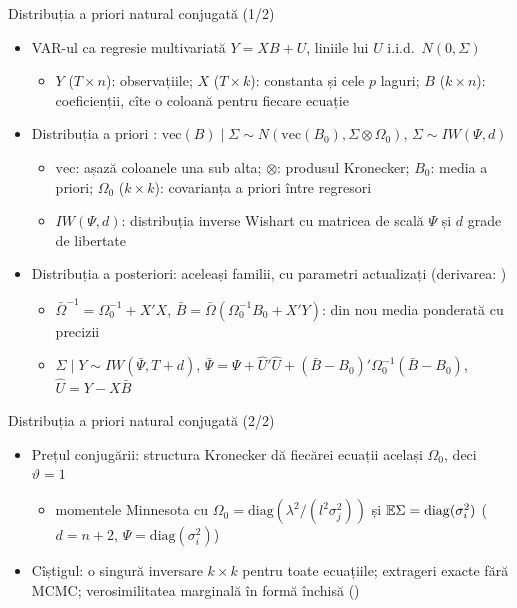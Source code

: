 \begin{frame}{Distribuția a priori natural conjugată (1/2)}
\itemsize{\small}
\begin{itemize}
    \item VAR-ul ca regresie multivariată $Y = XB + U$, liniile lui $U$ i.i.d.\ $N(0, \Sigma)$
    \begin{itemize}
        \item $Y$ ($T\times n$): observațiile; $X$ ($T\times k$): constanta și cele $p$ laguri; $B$ ($k\times n$): coeficienții, cîte o coloană pentru fiecare ecuație
    \end{itemize}
    \item Distribuția a priori : $\mathrm{vec}(B)\mid\Sigma \sim N(\mathrm{vec}(B_0), \Sigma\otimes\Omega_0)$, $\Sigma \sim IW(\Psi, d)$
    \begin{itemize}
        \item $\mathrm{vec}$: așază coloanele una sub alta; $\otimes$: produsul Kronecker; $B_0$: media a priori; $\Omega_0$ ($k\times k$): covarianța a priori între regresori
        \item $IW(\Psi, d)$: distribuția inverse Wishart cu matricea de scală $\Psi$ și $d$ grade de libertate
    \end{itemize}
    \item Distribuția a posteriori: aceleași familii, cu parametri actualizați (derivarea: )  %
    \begin{itemize}
        \item $\bar\Omega^{-1} = \Omega_0^{-1} + X'X$, $\bar B = \bar\Omega(\Omega_0^{-1}B_0 + X'Y)$: din nou media ponderată cu precizii
        \item $\Sigma\mid Y \sim IW(\bar\Psi, T + d)$, $\bar\Psi = \Psi + \hat U'\hat U + (\bar B - B_0)'\Omega_0^{-1}(\bar B - B_0)$, $\hat U = Y - X\bar B$
    \end{itemize}
\end{itemize}
\end{frame}

\begin{frame}{Distribuția a priori natural conjugată (2/2)}
\itemsize{\small}
\begin{itemize}
    \item Prețul conjugării: structura Kronecker dă fiecărei ecuații același $\Omega_0$, deci $\vartheta = 1$
    \begin{itemize}
        \item momentele Minnesota cu $\Omega_0 = \mathrm{diag}(\lambda^2/(l^2\sigma_j^2))$ și $\mathbb{E}\Sigma = \mathrm{diag}(\sigma_i^2)$ ($d = n + 2$, $\Psi = \mathrm{diag}(\sigma_i^2)$)
    \end{itemize}
    \item Cîștigul: o singură inversare $k\times k$ pentru toate ecuațiile; extrageri exacte fără MCMC; verosimilitatea marginală în formă închisă ()  %
\end{itemize}
\end{frame}

